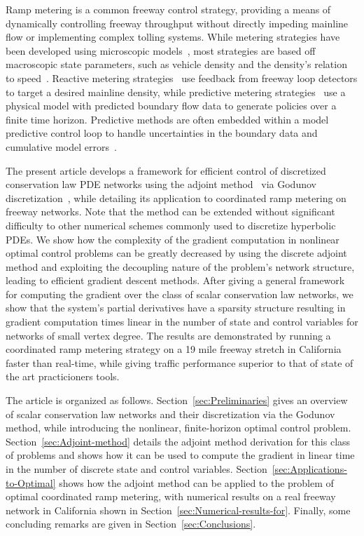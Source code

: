 Ramp metering is a common freeway control strategy, providing a means of 
dynamically controlling freeway throughput without directly impeding mainline 
flow or implementing complex tolling systems. While metering strategies have 
been developed using microscopic models~\cite{Ben-Akiva2003}, most strategies 
are based off macroscopic state parameters, such as vehicle density and the 
density's relation to 
speed~\cite{richards1956shock,lighthill1955kinematic,daganzo1995cell}. Reactive 
metering strategies~\cite{Papageorgiou1991,Papamichail,Kachroo2003} use 
feedback from freeway loop detectors to target a desired mainline density, 
while predictive metering 
strategies~\cite{Frejo2011,Kotsialos2004,gomes2006optimal,Chen1997} use a 
physical model with predicted boundary flow data to generate policies over a 
finite time horizon. Predictive methods are often embedded within a model 
predictive control loop to handle uncertainties in the boundary data and 
cumulative model errors~\cite{Muralidharana}.

The present article develops a framework for efficient control of discretized 
conservation law PDE networks using the adjoint 
method~\cite{Giles2000,Pironneau1974} via Godunov 
discretization~\cite{godunov1959}, while detailing its application to 
coordinated ramp metering on freeway networks. Note that the method can be extended without significant difficulty to other numerical schemes commonly used to discretize hyperbolic PDEs. We show how the complexity of 
the gradient computation in nonlinear optimal control problems can be greatly 
decreased by using the discrete adjoint method and exploiting the decoupling 
nature of the problem's network structure, leading to efficient gradient 
descent methods. After giving a general framework for computing the gradient 
over the class of scalar conservation law networks, we show that the system's 
partial derivatives have a sparsity structure resulting in gradient computation 
times linear in the number of state and control variables for networks of small vertex degree. The results are 
demonstrated by running a coordinated ramp metering strategy on a 19 mile 
freeway stretch in California faster than real-time, while giving traffic 
performance superior to that of state of the art practicioners tools.

The article is organized as follows. Section~\ref{sec:Preliminaries} gives an 
overview of scalar conservation law networks and their discretization via the 
Godunov method, while introducing the nonlinear, finite-horizon optimal control 
problem. Section~\ref{sec:Adjoint-method} details the adjoint method derivation 
for this class of problems and shows how it can be used to compute the gradient 
in linear time in the number of discrete state and control variables.  
Section~\ref{sec:Applications-to-Optimal} shows how the adjoint method can be 
applied to the problem of optimal coordinated ramp metering, with numerical 
results on a real freeway network in California shown in 
Section~\ref{sec:Numerical-results-for}. Finally, some concluding remarks are 
given in Section~\ref{sec:Conclusions}.
